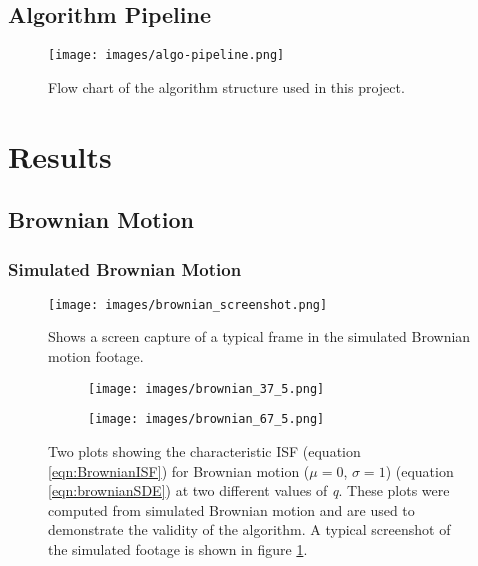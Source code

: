 \documentclass[11pt]{article}
\begin{document}
\subsection{Algorithm Pipeline}
\begin{figure}[H]
\centering
\texttt{[image: images/algo-pipeline.png]}
\caption{Flow chart of the algorithm structure used in this project.}
\end{figure}

\section{Results}
\label{section:results}
\subsection{Brownian Motion}
\label{section:brownian}
\subsubsection{Simulated Brownian Motion}
\begin{figure}[H]
  \centering
  \texttt{[image: images/brownian\_screenshot.png]}
  \caption{Shows a screen capture of a typical frame in the simulated Brownian motion footage.}
  \label{fig:simulated_brownian_screenshot}
\end{figure}

\begin{figure}[H]
\begin{subfigure}[t]{.47\textwidth}
  \centering
  \texttt{[image: images/brownian\_37\_5.png]}
  \label{fig:simulated_brownian1_37_5}
\end{subfigure}%
\hfill
\begin{subfigure}[t]{.47\textwidth}
  \centering
  \texttt{[image: images/brownian\_67\_5.png]}
 \label{fig:simulated_brownian1_67_5}
\end{subfigure}
\caption{Two plots showing the characteristic ISF (equation \ref{eqn:BrownianISF}) for Brownian motion ($\mu = 0$, $\sigma = 1$) (equation \ref{eqn:brownianSDE}) at two different values of \textit{q}. These plots were computed from simulated Brownian motion and are used to demonstrate the validity of the algorithm. A typical screenshot of the simulated footage is shown in figure \ref{fig:simulated_brownian_screenshot}.}
\label{fig:simulated_brownian1}
\end{figure}
\end{document}
